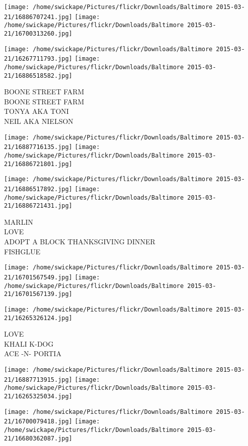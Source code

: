 \documentclass[10pt,letterpaper]{article}
\begin{document}
\texttt{[image: /home/swickape/Pictures/flickr/Downloads/Baltimore 2015-03-21/16886707241.jpg]}
\texttt{[image: /home/swickape/Pictures/flickr/Downloads/Baltimore 2015-03-21/16700313260.jpg]}

\texttt{[image: /home/swickape/Pictures/flickr/Downloads/Baltimore 2015-03-21/16267711793.jpg]}
\texttt{[image: /home/swickape/Pictures/flickr/Downloads/Baltimore 2015-03-21/16886518582.jpg]}

BOONE STREET FARM\\
BOONE STREET FARM\\
TONYA AKA TONI\\
NEIL AKA NIELSON\\
\pagebreak

\texttt{[image: /home/swickape/Pictures/flickr/Downloads/Baltimore 2015-03-21/16887716135.jpg]}
\texttt{[image: /home/swickape/Pictures/flickr/Downloads/Baltimore 2015-03-21/16886721801.jpg]}

\texttt{[image: /home/swickape/Pictures/flickr/Downloads/Baltimore 2015-03-21/16886517892.jpg]}
\texttt{[image: /home/swickape/Pictures/flickr/Downloads/Baltimore 2015-03-21/16886721431.jpg]}

MARLIN\\
LOVE\\
ADOPT A BLOCK THANKSGIVING DINNER\\
FISHGLUE\\
\pagebreak

\texttt{[image: /home/swickape/Pictures/flickr/Downloads/Baltimore 2015-03-21/16701567549.jpg]}
\texttt{[image: /home/swickape/Pictures/flickr/Downloads/Baltimore 2015-03-21/16701567139.jpg]}

\vspace{0.25in}
\texttt{[image: /home/swickape/Pictures/flickr/Downloads/Baltimore 2015-03-21/16265326124.jpg]}

LOVE\\
KHALI K{-}DOG\\
ACE {-}N{-} PORTIA\\
\pagebreak

\texttt{[image: /home/swickape/Pictures/flickr/Downloads/Baltimore 2015-03-21/16887713915.jpg]}
\texttt{[image: /home/swickape/Pictures/flickr/Downloads/Baltimore 2015-03-21/16265325034.jpg]}

\texttt{[image: /home/swickape/Pictures/flickr/Downloads/Baltimore 2015-03-21/16700079418.jpg]}
\texttt{[image: /home/swickape/Pictures/flickr/Downloads/Baltimore 2015-03-21/16680362087.jpg]}
\end{document}
